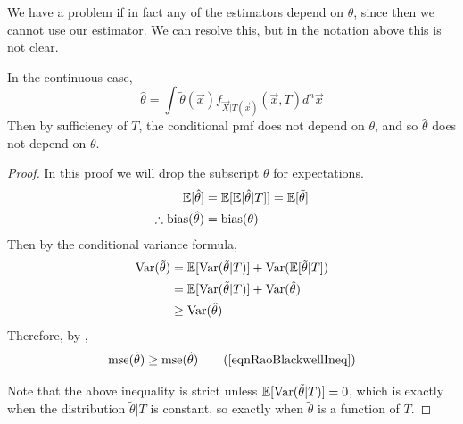 \documentclass[../Main.tex]{subfiles}
\begin{document}
\begin{remark}
    We have a problem if in fact any of the estimators depend on $\theta$, since then we cannot use our estimator. We can resolve this, but in the notation above this is not clear.

    In the continuous case,
    \begin{equation*}
        \hat{\theta} = \int \tilde{\theta}(\vec{x}) f_{\vec{X} | T(\vec{x})}(\vec{x}, T) d^n \vec{x}
    \end{equation*}
    Then by sufficiency of $T$, the conditional pmf does not depend on $\theta$, and so $\hat{\theta}$ does not depend on $\theta$.
\end{remark}
\begin{proof}
    In this proof we will drop the subscript $\theta$ for expectations.
    \begin{align*}
        \mathbb{E}[\hat{\theta}] &= \mathbb{E}[\mathbb{E}[\hat{\theta} | T]] = \mathbb{E}[\tilde{\theta}] \\
        \therefore \operatorname{bias}(\hat{\theta}) &= \operatorname{bias}(\tilde{\theta})
    \end{align*}
    Then by the conditional variance formula,
    \begin{align*}
        \operatorname{Var}(\tilde{\theta}) &= \mathbb{E}[\operatorname{Var}(\tilde{\theta} | T)] + \operatorname{Var}(\mathbb{E}[\tilde{\theta} | T]) \\
        &= \mathbb{E}[\operatorname{Var}(\tilde{\theta} | T)] + \operatorname{Var}(\hat{\theta}) \\
        &\geq \operatorname{Var}(\hat{\theta})
    \end{align*}
    Therefore, by , 
    \begin{equation}
        \mse(\tilde{\theta}) \geq \mse(\hat{\theta})
        \tag{\ref{eqnRaoBlackwellIneq}}
    \end{equation}

    Note that the above inequality is strict unless $\mathbb{E}[\operatorname{Var}(\tilde{\theta} | T)] = 0$, which is exactly when the distribution $\tilde{\theta} | T$ is constant, so exactly when $\tilde{\theta}$ is a function of $T$.
\end{proof}
\end{document}
